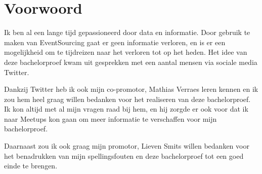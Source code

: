 
\chapter*{Voorwoord}
\label{ch:voorwoord}


Ik ben al een lange tijd gepassioneerd door data en informatie. Door gebruik te maken van EventSourcing gaat er geen informatie verloren, en is er een mogelijkheid om te tijdreizen naar het verloren tot op het heden. Het idee van deze bachelorproef kwam uit gesprekken met een aantal mensen via sociale media Twitter.

Dankzij Twitter heb ik ook mijn co-promotor, Mathias Verraes leren kennen en ik zou hem heel graag willen bedanken voor het realiseren van deze bachelorproef. Ik kon altijd met al mijn vragen raad bij hem, en hij zorgde er ook voor dat ik naar Meetups kon gaan om meer informatie te verschaffen voor mijn bachelorproef.

Daarnaast zou ik ook graag mijn promotor, Lieven Smits willen bedanken voor het benadrukken van mijn spellingsfouten en deze bachelorproef tot een goed einde te brengen.